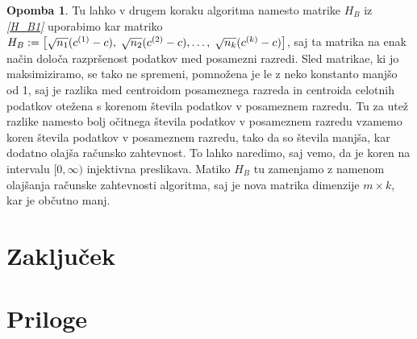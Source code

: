 \documentclass[mat1]{article}
\theoremstyle{definition}
\newtheorem{opomba}[definicija]{Opomba}
\begin{document}
\begin{opomba}
Tu lahko v drugem koraku algoritma namesto matrike $H_B$ iz \textit{\eqref{H_B1}} uporabimo kar matriko $H_B := \left[\sqrt{n_1} (c^{(1)} - c), \hspace{1mm} \sqrt{n_2} (c^{(2)} - c),\ldots, \hspace{1mm} \sqrt{n_k} (c^{(k)} - c)\right]$, saj ta matrika na enak način določa razpršenost podatkov med posamezni razredi. Sled matrikae, ki jo maksimiziramo, se tako ne spremeni, pomnožena je le z neko konstanto manjšo od 1, saj je razlika med centroidom posameznega razreda in centroida celotnih podatkov otežena s korenom števila podatkov v posameznem razredu. Tu za utež razlike namesto bolj očitnega števila podatkov v posameznem razredu vzamemo koren števila podatkov v posameznem razredu, tako da so števila manjša, kar dodatno olajša računsko zahtevnost. To lahko naredimo, saj vemo, da je koren na intervalu $[0, \infty)$ injektivna preslikava. Matiko $H_B$ tu zamenjamo z namenom olajšanja računske zahtevnosti algoritma, saj je nova matrika dimenzije $m \times k$, kar je občutno manj.
\end{opomba}

\section{Zaključek}

\section{Priloge}
\end{document}
